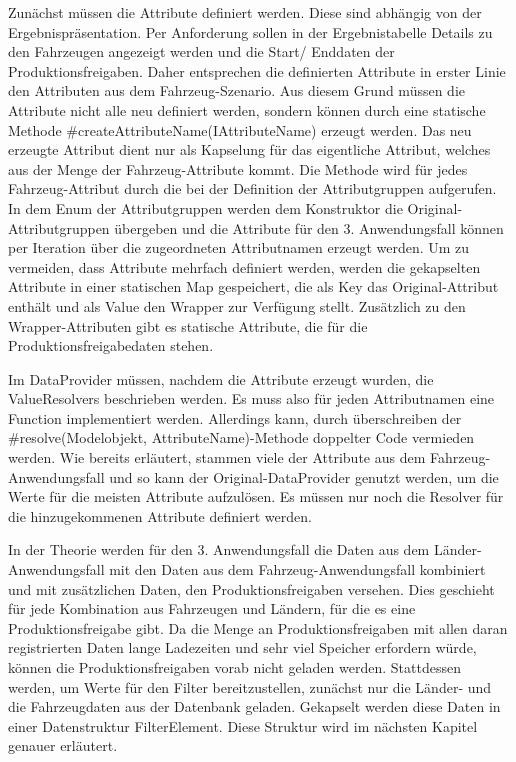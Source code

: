 Zunächst müssen die Attribute definiert werden. Diese sind abhängig von der Ergebnispräsentation. Per Anforderung sollen in der Ergebnistabelle Details zu den Fahrzeugen angezeigt werden und die Start/ Enddaten der Produktionsfreigaben. Daher entsprechen die definierten Attribute in erster Linie den Attributen aus dem Fahrzeug-Szenario. Aus diesem Grund müssen die Attribute nicht alle neu definiert werden, sondern können durch eine statische Methode \#createAttributeName(IAttributeName) erzeugt werden. Das neu erzeugte Attribut dient nur als Kapselung für das eigentliche Attribut, welches aus der Menge der Fahrzeug-Attribute kommt. Die Methode wird für jedes Fahrzeug-Attribut durch die bei der Definition der Attributgruppen aufgerufen. In dem Enum der Attributgruppen werden dem Konstruktor die Original-Attributgruppen übergeben und die Attribute für den 3. Anwendungsfall können per Iteration über die zugeordneten Attributnamen erzeugt werden. Um zu vermeiden, dass Attribute mehrfach definiert werden, werden die gekapselten Attribute in einer statischen Map gespeichert, die als Key das Original-Attribut enthält und als Value den Wrapper zur Verfügung stellt. Zusätzlich zu den Wrapper-Attributen gibt es statische Attribute, die für die Produktionsfreigabedaten stehen.

Im DataProvider müssen, nachdem die Attribute erzeugt wurden, die ValueResolvers beschrieben werden. Es muss also für jeden Attributnamen eine Function implementiert werden. Allerdings kann, durch überschreiben der \#resolve(Modelobjekt, AttributeName)-Methode doppelter Code vermieden werden. Wie bereits erläutert, stammen viele der Attribute aus dem Fahrzeug-Anwendungsfall und so kann der Original-DataProvider genutzt werden, um die Werte für die meisten Attribute aufzulösen. Es müssen nur noch die Resolver für die hinzugekommenen Attribute definiert werden.

In der Theorie werden für den 3. Anwendungsfall die Daten aus dem Länder-Anwendungsfall mit den Daten aus dem Fahrzeug-Anwendungsfall kombiniert und mit zusätzlichen Daten, den Produktionsfreigaben versehen. Dies geschieht für jede Kombination aus Fahrzeugen und Ländern, für die es eine Produktionsfreigabe gibt. Da die Menge an Produktionsfreigaben mit allen daran registrierten Daten lange Ladezeiten und sehr viel Speicher erfordern würde, können die Produktionsfreigaben vorab nicht geladen werden. Stattdessen werden, um Werte für den Filter bereitzustellen, zunächst nur die Länder- und die Fahrzeugdaten aus der Datenbank geladen. Gekapselt werden diese Daten in einer Datenstruktur FilterElement. Diese Struktur wird im nächsten Kapitel genauer erläutert.

